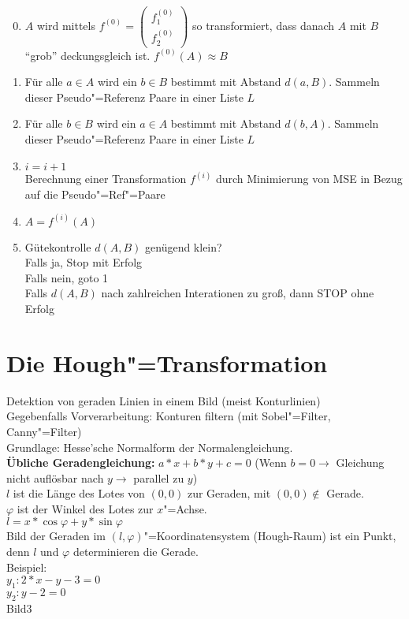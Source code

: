 \documentclass[a4paper,12pt]{scrreprt}
\newcommand{\Nb}[1]{\textbf{#1}}
\begin{document}
\begin{enumerate}
\setcounter{enumi}{-1}
\item $A$ wird mittels $f^{(0)}=\begin{pmatrix}f_1^{(0)}\\f_2^{(0)}\end{pmatrix}$ so transformiert, dass danach
		$A$ mit $B$ ``grob'' deckungsgleich ist. $f^{(0)}(A)\approx B$
\item Für alle $a\in A$ wird ein $b\in B$ bestimmt mit Abstand
	$d(a,B)$. Sammeln dieser Pseudo"=Referenz Paare in einer Liste $L$
\item Für alle $b\in B$ wird ein $a\in A$ bestimmt mit Abstand
	$d(b,A)$. Sammeln dieser Pseudo"=Referenz Paare in einer Liste $L$
\item $i=i+1$\\
Berechnung einer Transformation $f^{(i)}$ durch Minimierung von MSE in Bezug auf die Pseudo"=Ref"=Paare \item $A=f^{(i)}(A)$
\item Gütekontrolle $d(A,B)$ genügend klein? \\ Falls ja, Stop mit
	Erfolg\\ Falls nein,  goto 1\\ Falls $d(A,B)$ nach zahlreichen Interationen zu groß, dann STOP ohne Erfolg
\end{enumerate}

\section{Die Hough"=Transformation} Detektion von geraden Linien in
einem Bild (meist Konturlinien)\\ Gegebenfalls Vorverarbeitung:
Konturen filtern (mit Sobel"=Filter, Canny"=Filter)\\ Grundlage:
Hesse'sche Normalform der Normalengleichung.\\ \Nb{Übliche
Geradengleichung:} $a*x+b*y+c=0$ (Wenn $b=0\to$ Gleichung nicht
auflösbar nach $y \rightarrow$ parallel zu $y$)\\ $l$ ist die Länge des Lotes von $(0,0)$ zur
Geraden, mit $(0,0)\not\in$ Gerade.\\ $\varphi$ ist der Winkel des
Lotes zur $x$"=Achse.\\ $l=x*\cos{\varphi}+y*\sin{\varphi}$\\ Bild der
Geraden im $(l,\varphi)$"=Koordinatensystem (Hough-Raum) ist ein Punkt, denn  $l$
und $\varphi$ determinieren die Gerade.\\
Beispiel:\\
$y_1 : 2* x -y -3 = 0$\\
$y_2 : y-2= 0$\\
Bild3\\
\end{document}
